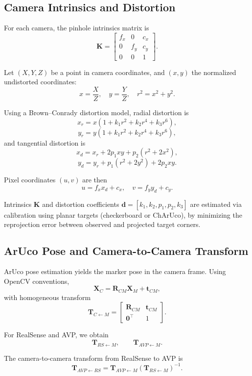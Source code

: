 \documentclass[11pt]{article}
\begin{document}
\subsection{Camera Intrinsics and Distortion}

For each camera, the pinhole intrinsics matrix is
\[
\mathbf{K} =
\begin{bmatrix}
f_x & 0 & c_x \\
0 & f_y & c_y \\
0 & 0 & 1
\end{bmatrix}.
\]

Let $(X,Y,Z)$ be a point in camera coordinates, and $(x,y)$ the normalized undistorted coordinates:
\[
x = \frac{X}{Z}, \quad y = \frac{Y}{Z}, \quad r^2 = x^2 + y^2.
\]

Using a Brown--Conrady distortion model, radial distortion is
\[
x_r = x \left( 1 + k_1 r^2 + k_2 r^4 + k_3 r^6 \right),
\]
\[
y_r = y \left( 1 + k_1 r^2 + k_2 r^4 + k_3 r^6 \right),
\]
and tangential distortion is
\[
x_d = x_r + 2 p_1 x y + p_2 (r^2 + 2 x^2),
\]
\[
y_d = y_r + p_1 (r^2 + 2 y^2) + 2 p_2 x y.
\]

Pixel coordinates $(u,v)$ are then
\[
u = f_x x_d + c_x, \quad v = f_y y_d + c_y.
\]

Intrinsics $\mathbf{K}$ and distortion coefficients $\mathbf{d} = [k_1,k_2,p_1,p_2,k_3]$ are estimated via calibration using planar targets (checkerboard or ChArUco), by minimizing the reprojection error between observed and projected target corners.

\subsection{ArUco Pose and Camera-to-Camera Transform}

ArUco pose estimation yields the marker pose in the camera frame. Using OpenCV conventions,
\[
\mathbf{X}_C = \mathbf{R}_{CM} \mathbf{X}_M + \mathbf{t}_{CM},
\]
with homogeneous transform
\[
\mathbf{T}_{C \leftarrow M} =
\begin{bmatrix}
\mathbf{R}_{CM} & \mathbf{t}_{CM} \\
\mathbf{0}^\top & 1
\end{bmatrix}.
\]

For RealSense and AVP, we obtain
\[
\mathbf{T}_{RS \leftarrow M}, \qquad \mathbf{T}_{AVP \leftarrow M}.
\]

The camera-to-camera transform from RealSense to AVP is
\[
\mathbf{T}_{AVP \leftarrow RS} =
\mathbf{T}_{AVP \leftarrow M}
\left( \mathbf{T}_{RS \leftarrow M} \right)^{-1}.
\]
\end{document}

